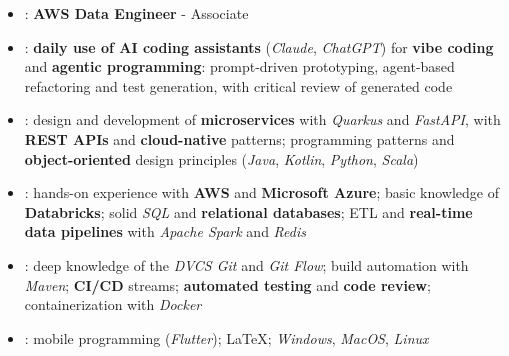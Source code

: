 \documentclass[letterpaper]{template-eng} %
\begin{document}
\begin{itemize}[leftmargin=*,itemsep=1pt,topsep=2pt,parsep=0pt]
    \item {}: \textbf{AWS Data Engineer} - Associate
    \item {}: \textbf{daily use of AI coding assistants} (\textit{Claude}, \textit{ChatGPT}) for \textbf{vibe coding} and \textbf{agentic programming}: prompt-driven prototyping, agent-based refactoring and test generation, with critical review of generated code
    \item {}: design and development of \textbf{microservices} with \textit{Quarkus} and \textit{FastAPI}, with \textbf{REST APIs} and \textbf{cloud-native} patterns; programming patterns and \textbf{object-oriented} design principles (\textit{Java}, \textit{Kotlin}, \textit{Python}, \textit{Scala})
    \item {}: hands-on experience with \textbf{AWS} and \textbf{Microsoft Azure}; basic knowledge of \textbf{Databricks}; solid \textit{SQL} and \textbf{relational databases}; ETL and \textbf{real-time data pipelines} with \textit{Apache Spark} and \textit{Redis}
    \item {}: deep knowledge of the \textit{DVCS Git} and \textit{Git Flow}; build automation with \textit{Maven}; \textbf{CI/CD} streams; \textbf{automated testing} and \textbf{code review}; containerization with \textit{Docker}
    \item {}: mobile programming (\textit{Flutter}); \LaTeX;  \textit{Windows}, \textit{MacOS}, \textit{Linux}
\end{itemize}
\vspace{-\baselineskip}
\end{document}
